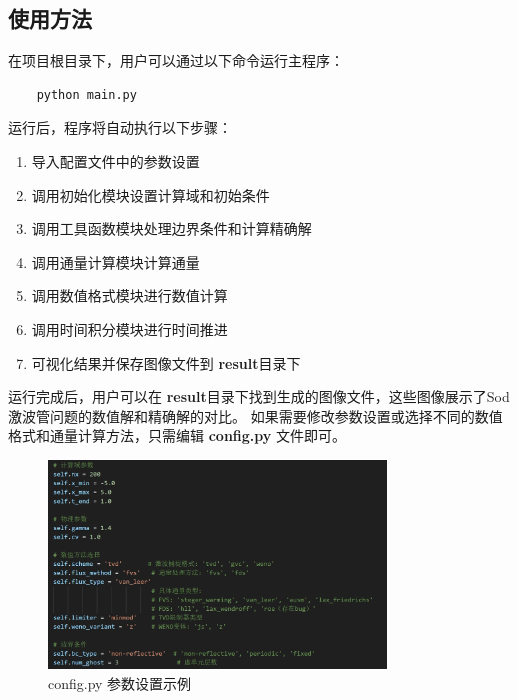 \documentclass[UTF8]{ctexart}
\begin{document}
\subsection{使用方法}
在项目根目录下，用户可以通过以下命令运行主程序：
\begin{verbatim}
    python main.py
\end{verbatim}
运行后，程序将自动执行以下步骤：
\begin{enumerate}           
    \item 导入配置文件中的参数设置
    \item 调用初始化模块设置计算域和初始条件
    \item 调用工具函数模块处理边界条件和计算精确解
    \item 调用通量计算模块计算通量
    \item 调用数值格式模块进行数值计算
    \item 调用时间积分模块进行时间推进
    \item 可视化结果并保存图像文件到 \textbf{result}目录下
\end{enumerate}
运行完成后，用户可以在 \textbf{result}目录下找到生成的图像文件，这些图像展示了Sod激波管问题的数值解和精确解的对比。
如果需要修改参数设置或选择不同的数值格式和通量计算方法，只需编辑 \textbf{config.py} 文件即可。
\begin{figure}
    \centering
    \includegraphics[width=0.8\textwidth]{config_example.png}
    \caption{config.py 参数设置示例}
    \label{fig:config_example}
\end{figure}
\end{document}
